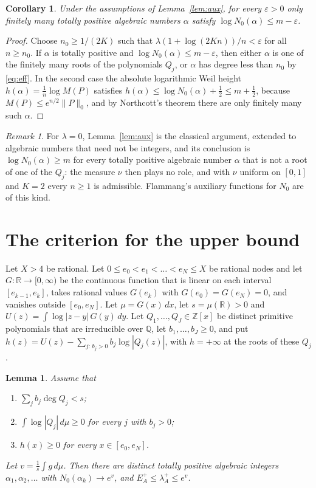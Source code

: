 \documentclass[11pt]{amsart}
\newtheorem{lemma}[theorem]{Lemma}
\newtheorem{corollary}[theorem]{Corollary}
\theoremstyle{remark}
\newtheorem{remark}[theorem]{Remark}
\numberwithin{equation}{section}
\newcommand{\R}{\mathbb{R}}
\newcommand{\Z}{\mathbb{Z}}
\newcommand{\Q}{\mathbb{Q}}
\begin{document}
\begin{corollary}\label{cor:fin}
Under the assumptions of Lemma~\ref{lem:aux}, for every $\varepsilon>0$ only finitely many totally positive algebraic numbers $\alpha$ satisfy $\log N_0(\alpha)\le m-\varepsilon$.
\end{corollary}

\begin{proof}
Choose $n_0\ge1/(2K)$ such that $\lambda(1+\log(2Kn))/n<\varepsilon$ for all $n\ge n_0$. If $\alpha$ is totally positive and $\log N_0(\alpha)\le m-\varepsilon$, then either $\alpha$ is one of the finitely many roots of the polynomials $Q_j$, or $\alpha$ has degree less than $n_0$ by \eqref{eq:eff}. In the second case the absolute logarithmic Weil height $h(\alpha)=\frac1n\log M(P)$ \cite[Section~1.6]{BG06} satisfies $h(\alpha)\le\log N_0(\alpha)+\frac12\le m+\frac12$, because $M(P)\le e^{n/2}\|P\|_0$, and by Northcott's theorem \cite[Theorem~1.6.8]{BG06} there are only finitely many such $\alpha$.
\end{proof}

\begin{remark}\label{rem:flammang}
For $\lambda=0$, Lemma~\ref{lem:aux} is the classical argument, extended to algebraic numbers that need not be integers, and its conclusion is $\log N_0(\alpha)\ge m$ for every totally positive algebraic number $\alpha$ that is not a root of one of the $Q_j$: the measure $\nu$ then plays no role, and with $\nu$ uniform on $[0,1]$ and $K=2$ every $n\ge1$ is admissible. Flammang's auxiliary functions for $N_0$ \cite[Section~3]{Fla15} are of this kind.
\end{remark}

\section{The criterion for the upper bound}\label{sec:upper}

Let $X>4$ be rational. Let $0\le e_0<e_1<\dots<e_N\le X$ be rational nodes and let $G\colon\R\to[0,\infty)$ be the continuous function that is linear on each interval $[e_{k-1},e_k]$, takes rational values $G(e_k)$ with $G(e_0)=G(e_N)=0$, and vanishes outside $[e_0,e_N]$. Let $\mu=G(x)\,dx$, let $s=\mu(\R)>0$ and $U(z)=\int\log|z-y|\,G(y)\,dy$. Let $Q_1,\dots,Q_J\in\Z[x]$ be distinct primitive polynomials that are irreducible over $\Q$, let $b_1,\dots,b_J\ge0$, and put $h(z)=U(z)-\sum_{j:\,b_j>0}b_j\log|Q_j(z)|$, with $h=+\infty$ at the roots of these $Q_j$.

\begin{lemma}\label{lem:crit}
Assume that
\begin{enumerate}[label=\textup{(C\arabic*)}]
\item\label{c1} $\sum_jb_j\deg Q_j<s$;
\item\label{c2} $\int\log|Q_j|\,d\mu\ge0$ for every $j$ with $b_j>0$;
\item\label{c3} $h(x)\ge0$ for every $x\in[e_0,e_N]$.
\end{enumerate}
Let $v=\frac1s\int g\,d\mu$. Then there are distinct totally positive algebraic integers $\alpha_1,\alpha_2,\dots$ with $N_0(\alpha_k)\to e^v$, and $E_A^+\le\lambda_A^+\le e^v$.
\end{lemma}
\end{document}

